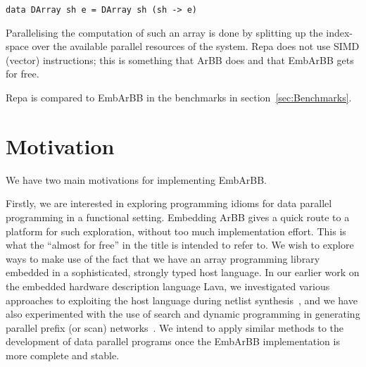 \begin{verbatim} 
data DArray sh e = DArray sh (sh -> e)  
\end{verbatim} 

Parallelising the computation of such an array is done by splitting up the 
index-space over the available parallel resources of the system. Repa does 
not use SIMD (vector) instructions; this is something that ArBB does and 
that EmbArBB gets for free. 

Repa is compared to EmbArBB in the benchmarks in section~\ref{sec:Benchmarks}.


\section{Motivation}

We have two main motivations for implementing EmbArBB.

Firstly, we are interested in exploring programming idioms for
data parallel programming in a functional setting. Embedding ArBB gives
a quick route to a platform for such exploration, without too much implementation effort. This is what the ``almost for free'' in the title is intended to refer to.
We wish to explore ways to make use of the fact that we have an array programming library embedded in a sophisticated, strongly typed host language. In our earlier work on the embedded hardware description language Lava, we investigated various approaches to exploiting the host language during netlist synthesis~\cite{LavaMultipliers}, and we have also experimented with the use of search and dynamic programming in generating parallel prefix (or scan) networks~\cite{SheeranJFP}. We intend to apply similar methods to the development of data parallel programs once the EmbArBB implementation is more complete and stable.




